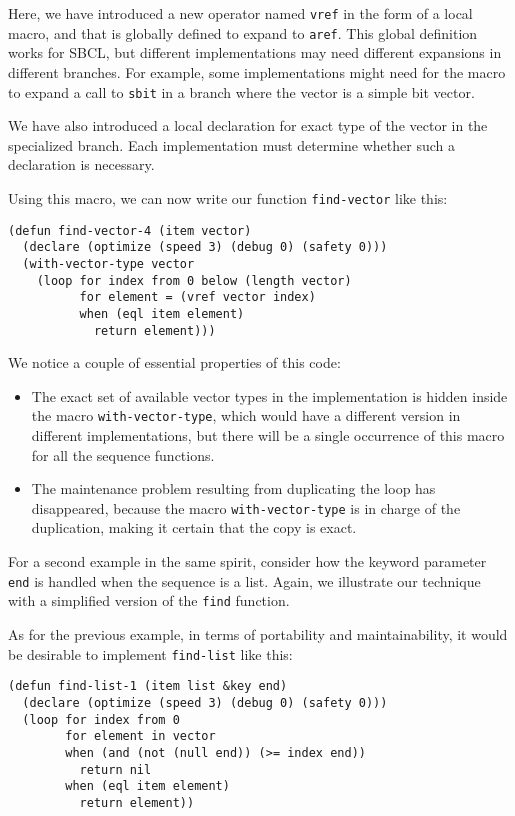 Here, we have introduced a new operator named \texttt{vref} in the
form of a local macro, and that is globally defined to expand to
\texttt{aref}.  This global definition works for SBCL, but different
implementations may need different expansions in different branches.
For example, some implementations might need for the macro to expand a
call to \texttt{sbit} in a branch where the vector is a simple bit
vector.

We have also introduced a local declaration for exact type of the
vector in the specialized branch.  Each implementation must determine
whether such a declaration is necessary.

Using this macro, we can now write our function \texttt{find-vector}
like this:

{\small\begin{verbatim}
(defun find-vector-4 (item vector)
  (declare (optimize (speed 3) (debug 0) (safety 0)))
  (with-vector-type vector
    (loop for index from 0 below (length vector)
          for element = (vref vector index)
          when (eql item element)
            return element)))
\end{verbatim}}

We notice a couple of essential properties of this code:

\begin{itemize}
\item The exact set of available vector types in the implementation is
  hidden inside the macro \texttt{with-vector-type}, which would have
  a different version in different \commonlisp{} implementations, but
  there will be a single occurrence of this macro for all the sequence
  functions.
\item The maintenance problem resulting from duplicating the loop has
  disappeared, because the macro \texttt{with-vector-type} is in
  charge of the duplication, making it certain that the copy is exact.
\end{itemize}

For a second example in the same spirit, consider how the keyword
parameter \texttt{end} is handled when the sequence is a list.
Again, we illustrate our technique with a simplified version of the
\texttt{find} function.

As for the previous example, in terms of portability and
maintainability, it would be desirable to implement
\texttt{find-list} like this:

{\small\begin{verbatim}
(defun find-list-1 (item list &key end)
  (declare (optimize (speed 3) (debug 0) (safety 0)))
  (loop for index from 0
        for element in vector
        when (and (not (null end)) (>= index end))
          return nil
        when (eql item element)
          return element))
\end{verbatim}}


